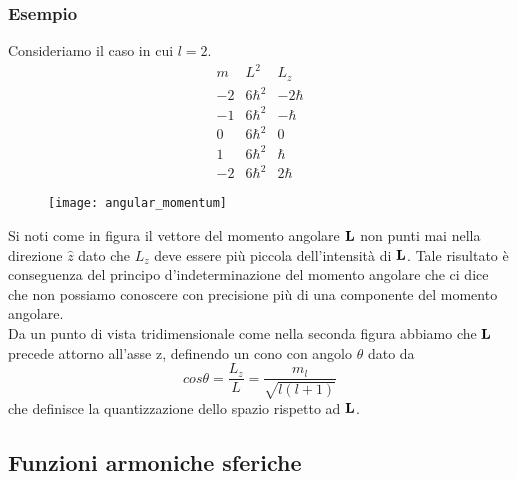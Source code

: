 \subsubsection{Esempio}

Consideriamo il caso in cui $l = 2 $.
\begin{equation*}
	\begin{array}{ccc}
		m & L^2 & L_z  \\
	\hline
	-2 & 6\hbar^2 & -2\hbar \\
	-1 & 6\hbar^2 & -\hbar \\
	0 & 6\hbar^2 &  0 \\
	1 & 6\hbar^2 & \hbar \\
	-2 & 6\hbar^2 & 2 \hbar
	\end{array}
\end{equation*}
\begin{figure}[!ht]
\vspace{0.1in}
\texttt{[image: angular\_momentum]}	
\centering
\vspace{0.1in}
\end{figure}

Si noti come in figura il vettore del momento angolare $\bold{L}$ non punti mai nella direzione $\hat{z}$ dato che $L_z$ deve essere  pi\`u piccola dell'intensit\`a di $\bold{L}$. Tale risultato \`e conseguenza del principo d'indeterminazione del momento angolare che ci dice che non possiamo conoscere con precisione pi\`u di una componente del momento angolare.
\\
Da un punto di vista tridimensionale come nella seconda figura abbiamo che $\bold{L}$ precede attorno all'asse z, definendo un cono con angolo $\theta$ dato da 
\begin{equation*}
	cos\theta = \frac{L_z}{L} = \frac{m_l}{\sqrt{l(l+1)}}
\end{equation*}
che definisce la quantizzazione dello spazio rispetto ad $\bold{L}$.

\subsection{Funzioni armoniche sferiche}

